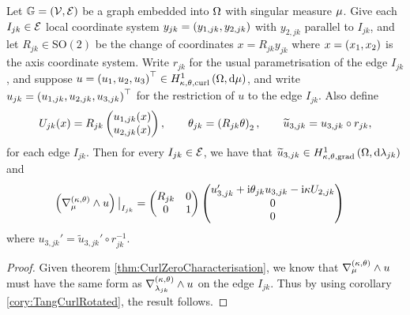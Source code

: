 \begin{theorem} \label{thm:TangCurlGraph}
	Let $\mathbb{G}=\left( \mathcal{V}, \mathcal{E} \right)$ be a graph embedded into $\Omega$ with singular measure $\mu$.
	Give each $I_{jk}\in\mathcal{E}$ local coordinate system $y_{jk}=\left( y_{1, jk},y_{2, jk} \right)$ with $y_{2,jk}$ parallel to $I_{jk}$, and let $R_{jk}\in\mathrm{SO}(2)$ be the change of coordinates $x=R_{jk}y_{jk}$ where $x=\left( x_1, x_2 \right)$ is the axis coordinate system.
	Write $r_{jk}$ for the usual parametrisation of the edge $I_{jk}$, and suppose $u=\left( u_1, u_2, u_3 \right)^\top\in H^1_{\kappa,\theta,\mathrm{curl}}\left( \Omega, \mathrm{d}\mu \right)$, and write $u_{jk}=\left( u_{1,jk}, u_{2,jk}, u_{3,jk} \right)^\top$ for the restriction of $u$ to the edge $I_{jk}$.
	Also define
	\begin{align*}
		U_{jk}(x) = R_{jk}\begin{pmatrix} u_{1, jk}(x) \\ u_{2, jk}(x) \end{pmatrix},
		\qquad \theta_{jk} = \left(  R_{jk}\theta  \right)_2,
		\qquad \widetilde{u}_{3,jk} = u_{3,jk} \circ r_{jk},
	\end{align*}
	for each edge $I_{jk}$.
	Then for every $I_{jk}\in\mathcal{E}$, we have that $\widetilde{u}_{3,jk}\in H^1_{\kappa,\theta,\mathrm{grad}}\left( \Omega, \mathrm{d}\lambda_{jk} \right)$ and
	\begin{align*}
		\left(  \nabla_{\mu}^{\left( \kappa, \theta \right)}\wedge u  \right)\big\vert_{I_{jk}} &= 
		\begin{pmatrix} R_{jk} & 0 \\ 0 & 1 \end{pmatrix}
		\begin{pmatrix} u_{3,jk}' + \mathrm{i}\theta_{jk} u_{3,jk} - \mathrm{i}\kappa U_{2,jk} \\ 0 \\ 0 \end{pmatrix}
	\end{align*}
	where $u_{3,jk}' = \widetilde{u}_{3,jk}' \circ r_{jk}^{-1}$.
\end{theorem}
\begin{proof}
	Given theorem \ref{thm:CurlZeroCharacterisation}, we know that $\nabla_{\mu}^{\left( \kappa, \theta \right)}\wedge u$ must have the same form as $\nabla_{\lambda_{jk}}^{\left( \kappa, \theta \right)}\wedge u$ on the edge $I_{jk}$.
	Thus by using corollary \ref{cory:TangCurlRotated}, the result follows.
\end{proof}

